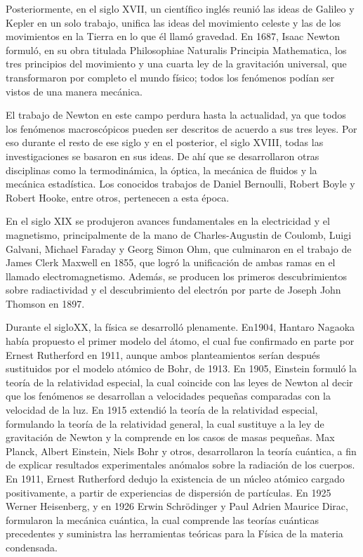\begin{small}
Posteriormente, en el siglo XVII, un científico inglés reunió las ideas de Galileo y Kepler en un solo trabajo, unifica las ideas del movimiento celeste y las de los movimientos en la Tierra en lo que él llamó gravedad. En 1687, Isaac Newton formuló, en su obra titulada Philosophiae Naturalis Principia Mathematica, los tres principios del movimiento y una cuarta ley de la gravitación universal, que transformaron por completo el mundo físico; todos los fenómenos podían ser vistos de una manera mecánica. 

El trabajo de Newton en este campo perdura hasta la actualidad, ya que todos los fenómenos macroscópicos pueden ser descritos de acuerdo a sus tres leyes. Por eso durante el resto de ese siglo y en el posterior, el siglo XVIII, todas las investigaciones se basaron en sus ideas. De ahí que se desarrollaron otras disciplinas como la termodinámica, la óptica, la mecánica de fluidos y la mecánica estadística. Los conocidos trabajos de Daniel Bernoulli, Robert Boyle y Robert Hooke, entre otros, pertenecen a esta época. 

En el siglo XIX se produjeron avances fundamentales en la electricidad y el magnetismo, principalmente de la mano de Charles-Augustin de Coulomb, Luigi Galvani, Michael Faraday y Georg Simon Ohm, que culminaron en el trabajo de James Clerk Maxwell en 1855, que logró la unificación de ambas ramas en el llamado electromagnetismo. Además, se producen los primeros descubrimientos sobre radiactividad y el descubrimiento del electrón por parte de Joseph John Thomson en 1897.

Durante el sigloXX, la física se desarrolló plenamente. En1904, Hantaro Nagaoka había propuesto el primer modelo del átomo, el cual fue confirmado en parte por Ernest Rutherford en 1911, aunque ambos planteamientos serían después sustituidos por el modelo atómico de Bohr, de 1913. En 1905, Einstein formuló la teoría de la relatividad especial, la cual coincide con las leyes de Newton al decir que los fenómenos se desarrollan a velocidades pequeñas comparadas con la velocidad de la luz. En 1915 extendió la teoría de la relatividad especial, formulando la teoría de la relatividad general, la cual sustituye a la ley de gravitación de Newton y la comprende en los casos de masas pequeñas. Max Planck, Albert Einstein, Niels Bohr y otros, desarrollaron la teoría cuántica, a fin de explicar resultados experimentales anómalos sobre la radiación de los cuerpos. En 1911, Ernest Rutherford dedujo la existencia de un núcleo atómico cargado positivamente, a partir de experiencias de dispersión de partículas. En 1925 Werner Heisenberg, y en 1926 Erwin Schrödinger y Paul Adrien Maurice Dirac, formularon la mecánica cuántica, la cual comprende las teorías cuánticas precedentes y suministra las herramientas teóricas para la Física de la materia condensada. 


\end{small}
